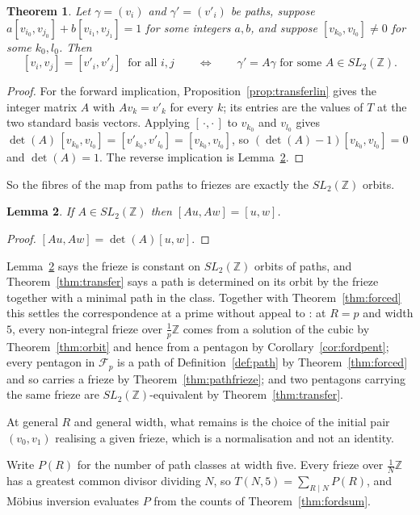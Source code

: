 \documentclass[11pt]{article}
\theoremstyle{plain}
\newtheorem{theorem}{Theorem}[section]
\newtheorem{lemma}[theorem]{Lemma}
\theoremstyle{definition}
\newcommand{\Z}{\mathbb{Z}}
\newcommand{\lat}{\tfrac{1}{N}\Z}
\begin{document}
\begin{theorem}\label{thm:fibre}
Let $\gamma=(v_i)$ and $\gamma'=(v'_i)$ be paths, suppose
$a[v_{i_0},v_{j_0}]+b[v_{i_1},v_{j_1}]=1$ for some integers $a,b$, and suppose
$[v_{k_0},v_{l_0}]\neq0$ for some $k_0,l_0$. Then
\[
  [v_i,v_j]=[v'_i,v'_j]\ \text{ for all } i,j
  \qquad\Longleftrightarrow\qquad
  \gamma'=A\gamma \text{ for some } A\in SL_2(\Z).
\]
\end{theorem}

\begin{proof}
For the forward implication, Proposition~\ref{prop:transferlin} gives the integer matrix
$A$ with $Av_k=v'_k$ for every $k$; its entries are the values of $T$ at the two standard
basis vectors. Applying $[\,\cdot,\cdot\,]$ to $v_{k_0}$ and $v_{l_0}$ gives
$\det(A)\,[v_{k_0},v_{l_0}]=[v'_{k_0},v'_{l_0}]=[v_{k_0},v_{l_0}]$, so
$(\det(A)-1)[v_{k_0},v_{l_0}]=0$ and $\det(A)=1$. The reverse implication is
Lemma~\ref{lem:sl2inv}.
\end{proof}

So the fibres of the map from paths to friezes are exactly the $SL_2(\Z)$ orbits.

\begin{lemma}\label{lem:sl2inv}
If $A\in SL_2(\Z)$ then $[Au,Aw]=[u,w]$.
\end{lemma}

\begin{proof}
$[Au,Aw]=\det(A)[u,w]$.
\end{proof}

Lemma~\ref{lem:sl2inv} says the frieze is constant on $SL_2(\Z)$ orbits of paths, and
Theorem~\ref{thm:transfer} says a path is determined on its orbit by the frieze together
with a minimal path in the class. Together with Theorem~\ref{thm:forced} this settles the
correspondence at a prime without appeal to \cite{KSSZ}: at $R=p$ and width $5$, every
non-integral frieze over $\tfrac1p\Z$ comes from a solution of the cubic by
Theorem~\ref{thm:orbit} and hence from a pentagon by Corollary~\ref{cor:fordpent}; every
pentagon in $\mathcal F_p$ is a path of Definition~\ref{def:path} by
Theorem~\ref{thm:forced} and so carries a frieze by Theorem~\ref{thm:pathfrieze}; and two
pentagons carrying the same frieze are $SL_2(\Z)$-equivalent by Theorem~\ref{thm:transfer}.

At general $R$ and general width, what remains is the choice of the initial pair
$(v_0,v_1)$ realising a given frieze, which is a normalisation and not an identity.

Write $P(R)$ for the number of path classes at width five. Every frieze over $\lat$ has a
greatest common divisor dividing $N$, so $T(N,5)=\sum_{R\mid N}P(R)$, and M\"obius inversion
evaluates $P$ from the counts of Theorem~\ref{thm:fordsum}.
\end{document}
